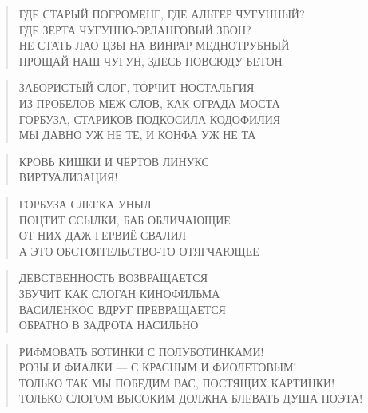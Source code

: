 \poemtitle{***}
\begin{verse}
ГДЕ СТАРЫЙ ПОГРОМЕНГ, ГДЕ АЛЬТЕР ЧУГУННЫЙ?\\
ГДЕ ЗЕРТА ЧУГУННО-ЭРЛАНГОВЫЙ ЗВОН?\\
НЕ СТАТЬ ЛАО ЦЗЫ НА ВИНРАР МЕДНОТРУБНЫЙ\\
ПРОЩАЙ НАШ ЧУГУН, ЗДЕСЬ ПОВСЮДУ БЕТОН
\end{verse}

\poemtitle{***}
\begin{verse}
ЗАБОРИСТЫЙ СЛОГ, ТОРЧИТ НОСТАЛЬГИЯ\\
ИЗ ПРОБЕЛОВ МЕЖ СЛОВ, КАК ОГРАДА МОСТА\\
ГОРБУЗА, СТАРИКОВ ПОДКОСИЛА КОДОФИЛИЯ\\
МЫ ДАВНО УЖ НЕ ТЕ, И КОНФА УЖ НЕ ТА
\end{verse}

\poemtitle{***}
\begin{verse}
КРОВЬ КИШКИ И ЧЁРТОВ ЛИНУКС\\
ВИРТУАЛИЗАЦИЯ!
\end{verse}

\poemtitle{***}
\begin{verse}
ГОРБУЗА СЛЕГКА УНЫЛ\\
ПОЦТИТ ССЫЛКИ, БАБ ОБЛИЧАЮЩИЕ\\
ОТ НИХ ДАЖ ГЕРВИЁ СВАЛИЛ\\
А ЭТО ОБСТОЯТЕЛЬСТВО-ТО ОТЯГЧАЮЩЕЕ
\end{verse}

\poemtitle{***}
\begin{verse}
ДЕВСТВЕННОСТЬ ВОЗВРАЩАЕТСЯ\\
ЗВУЧИТ КАК СЛОГАН КИНОФИЛЬМА\\
ВАСИЛЕНКОС ВДРУГ ПРЕВРАЩАЕТСЯ\\
ОБРАТНО В ЗАДРОТА НАСИЛЬНО
\end{verse}

\poemtitle{***}
\begin{verse}
РИФМОВАТЬ БОТИНКИ С ПОЛУБОТИНКАМИ! \\
РОЗЫ И ФИАЛКИ — С КРАСНЫМ И ФИОЛЕТОВЫМ!\\
ТОЛЬКО ТАК МЫ ПОБЕДИМ ВАС, ПОСТЯЩИХ КАРТИНКИ!\\
ТОЛЬКО СЛОГОМ ВЫСОКИМ ДОЛЖНА БЛЕВАТЬ ДУША ПОЭТА!
\end{verse}

